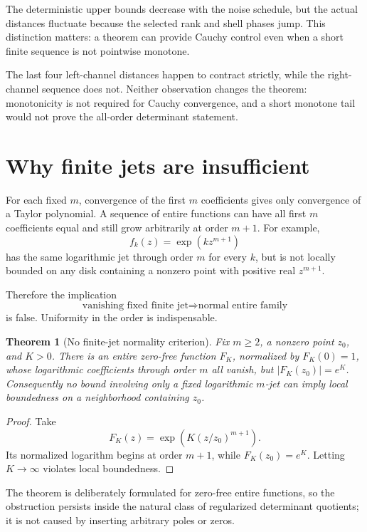 \documentclass[11pt]{article}
\newtheorem{theorem}{Theorem}[section]
\theoremstyle{remark}
\begin{document}
The deterministic upper bounds decrease with the noise schedule, but the
actual distances fluctuate because the selected rank and shell phases jump.
This distinction matters: a theorem can provide Cauchy control even when a
short finite sequence is not pointwise monotone.

The last four left-channel distances happen to contract strictly, while the
right-channel sequence does not.  Neither observation changes the theorem:
monotonicity is not required for Cauchy convergence, and a short monotone tail
would not prove the all-order determinant statement.

\section{Why finite jets are insufficient}

For each fixed $m$, convergence of the first $m$ coefficients gives only
convergence of a Taylor polynomial.  A sequence of entire functions can have
all first $m$ coefficients equal and still grow arbitrarily at order $m+1$.
For example,
\[
 f_k(z)=\exp(kz^{m+1})
\]
has the same logarithmic jet through order $m$ for every $k$, but is not
locally bounded on any disk containing a nonzero point with positive real
$z^{m+1}$.

Therefore the implication
\[
 \text{vanishing fixed finite jet}
 \Longrightarrow
 \text{normal entire family}
\]
is false.  Uniformity in the order is indispensable.

\begin{theorem}[No finite-jet normality criterion]\label{thm:no-finite}
Fix $m\ge2$, a nonzero point $z_0$, and $K>0$.  There is an entire zero-free
function $F_K$, normalized by $F_K(0)=1$, whose logarithmic coefficients
through order $m$ all vanish, but $|F_K(z_0)|=e^K$.
Consequently no bound involving only a fixed logarithmic $m$-jet can imply
local boundedness on a neighborhood containing $z_0$.
\end{theorem}

\begin{proof}
Take
\[
 F_K(z)=\exp\!\left(K(z/z_0)^{m+1}\right).
\]
Its normalized logarithm begins at order $m+1$, while $F_K(z_0)=e^K$.
Letting $K\to\infty$ violates local boundedness.
\end{proof}

The theorem is deliberately formulated for zero-free entire functions, so
the obstruction persists inside the natural class of regularized determinant
quotients; it is not caused by inserting arbitrary poles or zeros.
\end{document}
